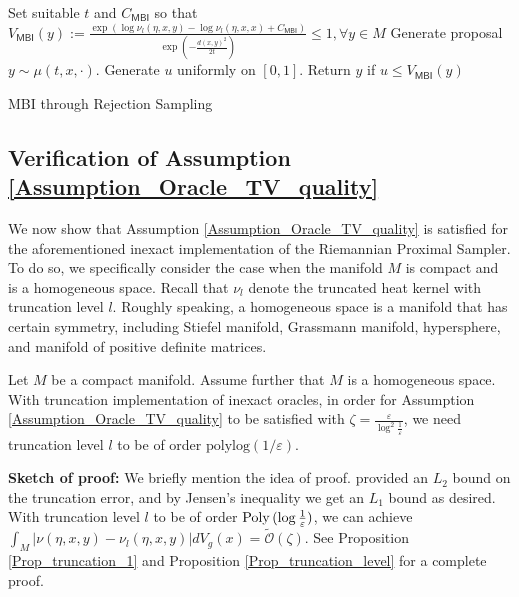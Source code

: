 

\begin{algorithm}[t]
    \begin{algorithmic}
    \STATE Set suitable $t$ and $C_{\mathsf{MBI}}$
    so that $V_{\mathsf{MBI}}(y) := \frac{\exp(\log \nu_{l}(\eta, x, y) - \log \nu_{l}(\eta, x, x) + C_{\mathsf{MBI}})}{\exp(-\frac{d(x, y)^{2}}{2t})} \le 1, \forall y \in M$
    \STATE Generate proposal $y \sim \mu(t, x, \cdot)$.
    \STATE Generate $u$ uniformly on $[0, 1]$. 
    \STATE Return $y$ if $u \le V_{\mathsf{MBI}}(y)$
    \ENDFOR
    \end{algorithmic}
    \caption{MBI through Rejection Sampling}
    \label{Inexact_BM} 
\end{algorithm}

\subsection{Verification of Assumption \ref{Assumption_Oracle_TV_quality}}
We now show that Assumption \ref{Assumption_Oracle_TV_quality} is satisfied for the aforementioned inexact implementation of the Riemannian Proximal Sampler. To do so, we specifically consider the case when the manifold $M$ is compact and is a homogeneous space. Recall that $\nu_{l}$ denote the truncated heat kernel with truncation level $l$. Roughly speaking, a homogeneous space is a manifold that has certain symmetry, including Stiefel manifold, Grassmann manifold, hypersphere, and manifold of positive deﬁnite matrices. 

\begin{proposition}\label{Prop_Verify_Assumption}
    Let $M$ be a compact manifold. Assume further that $M$ is a homogeneous space. 
    With truncation implementation of inexact oracles, 
    in order for Assumption \ref{Assumption_Oracle_TV_quality} to be satisfied
    with $\zeta = \frac{\varepsilon}{\log^{2} \frac{1}{\varepsilon}}$,
    we need truncation level $l$ to be of order $\textrm{polylog}({1}/{\varepsilon})$.
\end{proposition}
\textbf{Sketch of proof:} We briefly mention the idea of proof. 
\citet[Proposition 21]{azangulov2022stationary} provided an $L_{2}$ bound on the truncation error, and by Jensen's inequality 
we get an $L_{1}$ bound as desired.
With truncation level $l$ to be of order $\operatorname{Poly\,} (\log \frac{1}{\varepsilon})$, 
we can achieve $\int_{M} |\nu(\eta, x, y) - \nu_{l}(\eta, x, y)| dV_{g}(x) = \tilde{\mathcal{O}}(\zeta)$. See Proposition \ref{Prop_truncation_1} and Proposition \ref{Prop_truncation_level} for a complete proof.

